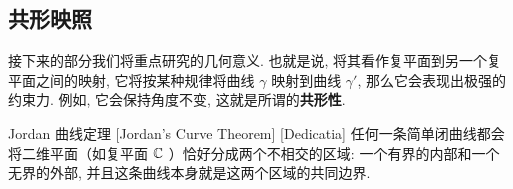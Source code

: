 




    \subsection{共形映照}

        \begin{intrormk}
            [Dedicatia]
            接下来的部分我们将重点研究\Analytic{}{}的几何意义. 也就是说, 将其看作复平面到另一个复平面之间的映射, 它将按某种规律将曲线 \(\gamma\) 映射到曲线 \(\gamma'\), 那么它会表现出极强的约束力. 例如, 它会保持角度不变, 这就是所谓的\textbf{共形性}.
        \end{intrormk}

        \begin{thm}
            {Jordan 曲线定理}
            [Jordan's Curve Theorem]
            [Dedicatia]
            任何一条简单闭曲线都会将二维平面（如复平面 \(\operatorname{\mathbb{C}}\) ）恰好分成两个不相交的区域: 一个有界的内部和一个无界的外部, 并且这条曲线本身就是这两个区域的共同边界. 
        \end{thm}

